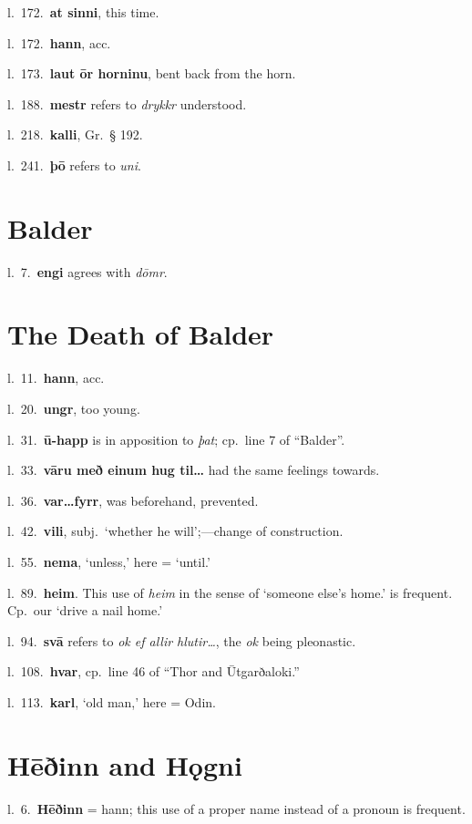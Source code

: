 \documentclass[12pt,letterpaper]{book}
\begin{document}
l.\ 172.\ \textbf{at sinni}, this time.

l.\ 172.\ \textbf{hann}, acc.

l.\ 173.\ \textbf{laut ōr horninu}, bent back from the horn.

l.\ 188.\ \textbf{mestr} refers to \textit{drykkr} understood.

l.\ 218.\ \textbf{kalli}, Gr.\ § 192.

l.\ 241.\ \textbf{þō} refers to \textit{uni}.


\section{Balder}

l.\ 7.\ \textbf{engi} agrees with \textit{dōmr}.


\section{The Death of Balder}

l.\ 11.\ \textbf{hann}, acc.

l.\ 20.\ \textbf{ungr}, too young.

l.\ 31.\ \textbf{ū-happ} is in apposition to \textit{þat}; cp.\ line 7
of ``Balder''.

l.\ 33.\ \textbf{vāru með einum hug til\ldots}  had the same feelings
towards.

l.\ 36.\ \textbf{var\ldots fyrr}, was beforehand, prevented.

l.\ 42.\ \textbf{vili}, subj.\ `whether he will';---change of construction.

l.\ 55.\ \textbf{nema}, `unless,' here = `until.'

l.\ 89.\ \textbf{heim}.  This use of \textit{heim} in the sense of `someone
else's home.' is frequent.  Cp.\ our `drive a nail home.'

l.\ 94.\ \textbf{svā} refers to \textit{ok ef allir hlutir\ldots}, the \textit{ok}
being pleonastic.

l.\ 108.\ \textbf{hvar}, cp.\ line 46 of ``Thor and Ūtgarðaloki.''

l.\ 113.\ \textbf{karl}, `old man,' here = Odin.


\section{Hēðinn and Hǫgni}

l.\ 6.\ \textbf{Hēðinn} = hann; this use of a proper name instead of a
pronoun is frequent.
\end{document}
